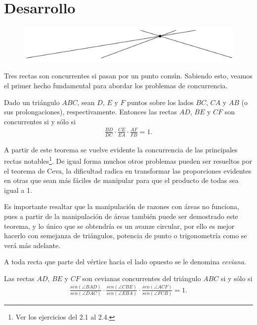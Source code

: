 \section{Desarrollo}

\begin{figure}[htb]
    \centering
    \includegraphics[width=14cm]{images/concurrence-1}
\end{figure}

Tres rectas son concurrentes si pasan por un punto común.
Sabiendo esto, veamos el primer hecho fundamental para abordar los problemas de concurrencia.

\begin{theorem}
    Dado un triángulo $ABC$, sean $D$, $E$ y $F$ puntos sobre los lados $BC$, $CA$ y $AB$ (o sus prolongaciones), respectivamente.
    Entonces las rectas $AD$, $BE$ y $CF$ son concurrentes si y sólo si
    \begin{gather*}
        \frac{BD}{DC} \cdot \frac{CE}{EA} \cdot \frac{AF}{FB} = 1.
    \end{gather*}
\end{theorem}

A partir de este teorema se vuelve evidente la concurrencia de las principales rectas notables\footnote{Ver los ejercicios del 2.1 al 2.4.}.
De igual forma muchos otros problemas pueden ser resueltos por el teorema de Ceva, la dificultad radica en transformar las proporciones evidentes en otras que sean más fáciles de manipular para que el producto de todas sea igual a 1.

Es importante resaltar que la manipulación de razones con áreas no funciona, pues a partir de la manipulación de áreas también puede ser demostrado este teorema, y lo único que se obtendría es un avanze circular, por ello es mejor hacerlo con semejanza de triángulos, potencia de punto o trigonometría como se verá más adelante.

\begin{section-definition}
    A toda recta que parte del vértice hacia el lado opuesto se le denomina \textit{ceviana.}
\end{section-definition}

\begin{theorem}
    Las rectas $AD$, $BE$ y $CF$ son cevianas concurrentes del triángulo $ABC$ si y sólo si
    \begin{gather*}
        \frac{sen(\angle BAD)}{sen(\angle DAC)} \cdot \frac{sen(\angle CBE)}{sen(\angle EBA)} \cdot \frac{sen(\angle ACF)}{sen(\angle FCB)} = 1.
    \end{gather*}
\end{theorem}

